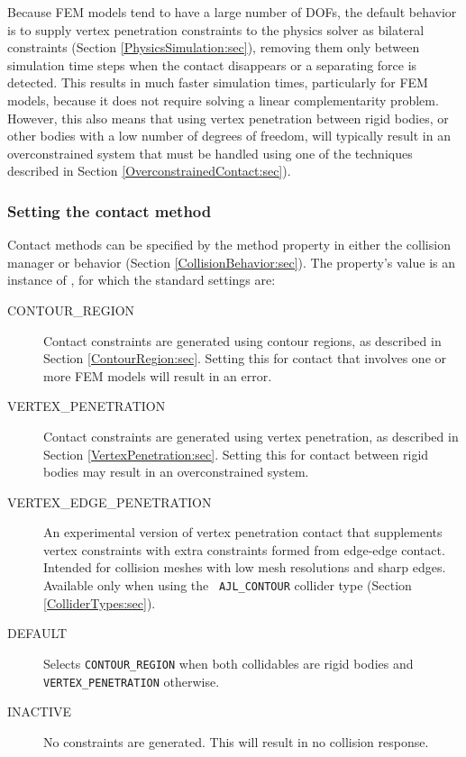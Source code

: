Because FEM models tend to have a large number of DOFs, the default
behavior is to supply vertex penetration constraints to the physics
solver as bilateral constraints (Section \ref{PhysicsSimulation:sec}),
removing them only between simulation time steps when the contact
disappears or a separating force is detected. This results in much
faster simulation times, particularly for FEM models, because it does
not require solving a linear complementarity problem. However, this
also means that using vertex penetration between rigid bodies, or
other bodies with a low number of degrees of freedom, will typically
result in an overconstrained system that must be handled using one of
the techniques described in Section \ref{OverconstrainedContact:sec}).

\subsubsection{Setting the contact method}
\label{SettingContactMethod:sec}

Contact methods can be specified by the {\sf method} property in
either the collision manager or behavior (Section
\ref{CollisionBehavior:sec}).  The property's value is an instance of
, for
which the standard settings are:

\begin{description}

\item[CONTOUR\_REGION]\mbox{}

Contact constraints are generated using contour regions, as described
in Section \ref{ContourRegion:sec}. Setting this for contact that
involves one or more FEM models will result in an error.

\item[VERTEX\_PENETRATION]\mbox{}

Contact constraints are generated using vertex penetration, as
described in Section \ref{VertexPenetration:sec}. Setting this for
contact between rigid bodies may result in an overconstrained system.

\item[VERTEX\_EDGE\_PENETRATION]\mbox{}

An experimental version of vertex penetration contact that
supplements vertex constraints with extra constraints formed from
edge-edge contact. Intended for collision meshes with low mesh
resolutions and sharp edges. Available only when using the {\tt
AJL\_CONTOUR} collider type (Section
\ref{ColliderTypes:sec}).

\item[DEFAULT]\mbox{}

Selects {\tt CONTOUR\_REGION} when both collidables are rigid bodies
and {\tt VERTEX\_PENETRATION} otherwise.

\item[INACTIVE]\mbox{}

No constraints are generated. This will result in no collision
response.

\end{description}

